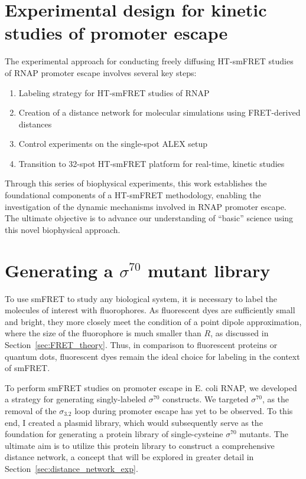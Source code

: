 \section{Experimental design for kinetic studies of promoter escape}
\label{sec:promoter_escape_exp}

The experimental approach for conducting freely diffusing \ac{HT-smFRET} studies of \ac{RNAP} promoter escape involves several key steps:

\begin{enumerate}
    \item Labeling strategy for \ac{HT-smFRET} studies of \ac{RNAP}
    \item Creation of a distance network for molecular simulations using FRET-derived distances
    \item Control experiments on the single-spot \ac{ALEX} setup
    \item Transition to 32-spot \ac{HT-smFRET} platform for real-time, kinetic studies
\end{enumerate}

Through this series of biophysical experiments, this work establishes the foundational components of a \ac{HT-smFRET} methodology, enabling the investigation of the dynamic mechanisms involved in \ac{RNAP} promoter escape. 
The ultimate objective is to advance our understanding of \enquote{basic} science using this novel biophysical approach.

\section{Generating a $\sigma^{70}$ mutant library}
\label{sec:sigma70_library_exp}

To use \ac{smFRET} to study any biological system, it is necessary to label the molecules of interest with fluorophores.
As fluorescent dyes are sufficiently small and bright, they more closely meet the condition of a point dipole approximation, where the size of the fluorophore is much smaller than $R$, as discussed in Section~\ref{sec:FRET_theory}.
Thus, in comparison to fluorescent proteins or quantum dots, fluorescent dyes remain the ideal choice for labeling in the context of \ac{smFRET}.

To perform \ac{smFRET} studies on promoter escape in \ac{E. coli} \ac{RNAP}, we developed a strategy for generating singly-labeled $\sigma^{70}$ constructs. 
We targeted $\sigma^{70}$, as the removal of the $\sigma_{3.2}$ loop during promoter escape has yet to be observed. 
To this end, I created a plasmid library, which would subsequently serve as the foundation for generating a protein library of single-cysteine $\sigma^{70}$ mutants. 
The ultimate aim is to utilize this protein library to construct a comprehensive distance network, a concept that will be explored in greater detail in Section~\ref{sec:distance_network_exp}.

